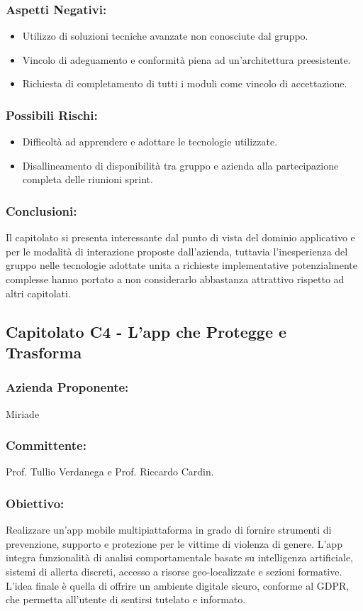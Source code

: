 \documentclass[a4paper,12pt]{article}
\begin{document}
\subsubsection*{Aspetti Negativi:}
\begin{itemize}
    \item Utilizzo di soluzioni tecniche avanzate non conosciute dal gruppo.
    \item Vincolo di adeguamento e conformità piena ad un'architettura preesistente.
    \item Richiesta di completamento di tutti i moduli come vincolo di accettazione.
\end{itemize}

\subsubsection*{Possibili Rischi:}
\begin{itemize}
    \item Difficoltà ad apprendere e adottare le tecnologie utilizzate.
    \item Disallineamento di disponibilità tra gruppo e azienda alla partecipazione completa delle riunioni sprint.
\end{itemize}

\subsubsection*{Conclusioni:}
Il capitolato si presenta interessante dal punto di vista del dominio applicativo e per le modalità di interazione proposte dall'azienda, tuttavia l'inesperienza del gruppo nelle tecnologie adottate unita a richieste implementative potenzialmente complesse hanno portato a non considerarlo abbastanza attrattivo rispetto ad altri capitolati.


\subsection{Capitolato C4 - L’app che Protegge e Trasforma}
\subsubsection*{Azienda Proponente:} Miriade
\subsubsection*{Committente:} Prof. Tullio Verdanega e Prof. Riccardo Cardin.
\subsubsection*{Obiettivo:}
Realizzare un’app mobile multipiattaforma in grado di fornire strumenti di prevenzione, supporto e protezione per le vittime di violenza di genere.  
L’app integra funzionalità di analisi comportamentale basate su intelligenza artificiale, sistemi di allerta discreti, accesso a risorse geo-localizzate e sezioni formative.  
L’idea finale è quella di offrire un ambiente digitale sicuro, conforme al GDPR, che permetta all’utente di sentirsi tutelato e informato.
\end{document}
